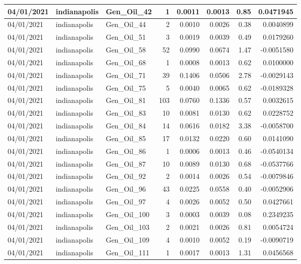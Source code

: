 \documentclass[
  letterpaper,
  DIV=11,
  numbers=noendperiod]{scrartcl}
\begin{document}
\begin{tabular}{l|l|l|r|r|r|r|r}
\hline
04/01/2021 & indianapolis & Gen\_Oil\_42 & 1 & 0.0011 & 0.0013 & 0.85 & 0.0471945\\
\hline
04/01/2021 & indianapolis & Gen\_Oil\_44 & 2 & 0.0010 & 0.0026 & 0.38 & 0.0040899\\
\hline
04/01/2021 & indianapolis & Gen\_Oil\_51 & 3 & 0.0019 & 0.0039 & 0.49 & 0.0179260\\
\hline
04/01/2021 & indianapolis & Gen\_Oil\_58 & 52 & 0.0990 & 0.0674 & 1.47 & -0.0051580\\
\hline
04/01/2021 & indianapolis & Gen\_Oil\_68 & 1 & 0.0008 & 0.0013 & 0.62 & 0.0100000\\
\hline
04/01/2021 & indianapolis & Gen\_Oil\_71 & 39 & 0.1406 & 0.0506 & 2.78 & -0.0029143\\
\hline
04/01/2021 & indianapolis & Gen\_Oil\_75 & 5 & 0.0040 & 0.0065 & 0.62 & -0.0189328\\
\hline
04/01/2021 & indianapolis & Gen\_Oil\_81 & 103 & 0.0760 & 0.1336 & 0.57 & 0.0032615\\
\hline
04/01/2021 & indianapolis & Gen\_Oil\_83 & 10 & 0.0081 & 0.0130 & 0.62 & 0.0228752\\
\hline
04/01/2021 & indianapolis & Gen\_Oil\_84 & 14 & 0.0616 & 0.0182 & 3.38 & -0.0058700\\
\hline
04/01/2021 & indianapolis & Gen\_Oil\_85 & 17 & 0.0132 & 0.0220 & 0.60 & 0.0141090\\
\hline
04/01/2021 & indianapolis & Gen\_Oil\_86 & 1 & 0.0006 & 0.0013 & 0.46 & -0.0540134\\
\hline
04/01/2021 & indianapolis & Gen\_Oil\_87 & 10 & 0.0089 & 0.0130 & 0.68 & -0.0537766\\
\hline
04/01/2021 & indianapolis & Gen\_Oil\_92 & 2 & 0.0014 & 0.0026 & 0.54 & -0.0079846\\
\hline
04/01/2021 & indianapolis & Gen\_Oil\_96 & 43 & 0.0225 & 0.0558 & 0.40 & -0.0052906\\
\hline
04/01/2021 & indianapolis & Gen\_Oil\_97 & 4 & 0.0026 & 0.0052 & 0.50 & 0.0427661\\
\hline
04/01/2021 & indianapolis & Gen\_Oil\_100 & 3 & 0.0003 & 0.0039 & 0.08 & 0.2349235\\
\hline
04/01/2021 & indianapolis & Gen\_Oil\_103 & 2 & 0.0021 & 0.0026 & 0.81 & 0.0054724\\
\hline
04/01/2021 & indianapolis & Gen\_Oil\_109 & 4 & 0.0010 & 0.0052 & 0.19 & -0.0090719\\
\hline
04/01/2021 & indianapolis & Gen\_Oil\_111 & 1 & 0.0017 & 0.0013 & 1.31 & 0.0456568\\

\end{tabular}
\end{document}
